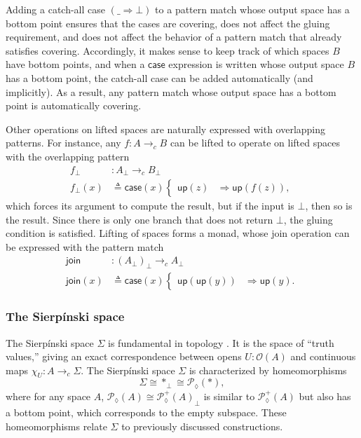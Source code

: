\documentclass[conference]{IEEEtran}
\newcommand{\PLower}{\mathcal{P}_\lozenge}
\newcommand{\cto}{\to_c}
\newcommand{\One}{\ast}
\newcommand{\Open}[1]{\mathcal{O}({#1})}
\newcommand{\wildcard}{\_}
\newcommand{\Branch}{\Rightarrow}
\newcommand{\up}{\mathsf{up}}
\begin{document}
Adding a catch-all case $(\wildcard \Branch \bot)$ to a pattern match whose output space has a bottom point ensures that the cases are covering, does not affect the gluing requirement, and does not affect the behavior of a pattern match that already satisfies covering. Accordingly, it makes sense to keep track of which spaces $B$ have bottom points, and when a $\mathsf{case}$ expression is written whose output space $B$ has a bottom point, the catch-all case can be added automatically (and implicitly). As a result, any pattern match whose output space has a bottom point is automatically covering.

Other operations on lifted spaces are naturally expressed with overlapping patterns. For instance, any $f : A \cto B$ can be lifted to operate on lifted spaces with the overlapping pattern
\begin{align*}
f_\bot &: A_\bot \cto B_\bot
\\ f_\bot(x) &\triangleq
  \mathsf{case}(x)
  \begin{cases}
  \up(z) &\Branch \up(f(z)),
  \end{cases}
\end{align*}
which forces its argument to compute the result, but if the input is $\bot$, then so is the result. Since there is only one branch that does not return $\bot$, the gluing condition is satisfied. Lifting of spaces forms a monad, whose join operation can be expressed with the pattern match
\begin{align*}
\mathsf{join} &: \left( A_\bot \right)_\bot \cto A_\bot
\\ \mathsf{join}(x) &\triangleq \mathsf{case}(x)
\begin{cases}
\up(\up(y)) &\Branch \up(y).
\end{cases}
\end{align*}

\subsubsection{The Sierp\'inski space}

The Sierp\'inski space $\Sigma$ is fundamental in topology \cite{escardo2004}. It is the space of ``truth values,'' giving an exact correspondence between opens $U : \Open{A}$ and continuous maps $\chi_U : A \cto \Sigma$. The Sierp\'inski space $\Sigma$ is characterized by homeomorphisms
\[
\Sigma \cong \One_\bot \cong \PLower(\One) ,
\]
where for any space $A$, $\PLower(A) \cong {\PLower^+(A)}_\bot$ is similar to $\PLower^+(A)$ but also has a bottom point, which corresponds to the empty subspace. These homeomorphisms relate $\Sigma$ to previously discussed constructions.
\end{document}
